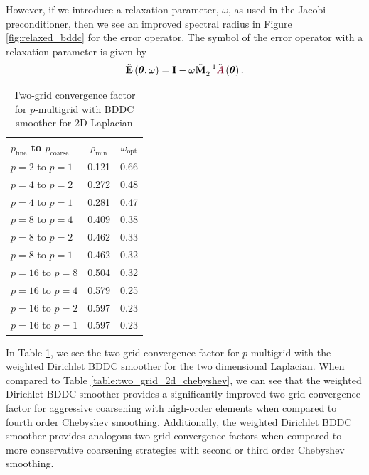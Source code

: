 However, if we introduce a relaxation parameter, $\omega$, as used in the Jacobi preconditioner, then we see an improved spectral radius in Figure \ref{fig:relaxed_bddc} for the error operator.
The symbol of the error operator with a relaxation parameter is given by
\begin{equation}
\tilde{\mathbf{E}} \left( \boldsymbol{\theta}, \omega \right) = \mathbf{I} - \omega \tilde{\mathbf{M}}_2^{-1} \tilde{{\color{burgundy}A}} \left( \boldsymbol{\theta} \right).
\end{equation}

\begin{table}[ht!]
\begin{center}
\begin{tabular}{l cc}
  \toprule
  $p_{\text{fine}}$ to $p_{\text{coarse}}$  & $\rho_{\min}$ & $\omega_{\text{opt}}$  \\
  \toprule
  $p = 2$ to $p = 1$   &  0.121 & 0.66  \\
  \midrule
  $p = 4$ to $p = 2$   &  0.272 & 0.48  \\
  $p = 4$ to $p = 1$   &  0.281 & 0.47  \\
  \midrule
  $p = 8$ to $p = 4$   &  0.409 & 0.38  \\
  $p = 8$ to $p = 2$   &  0.462 & 0.33  \\
  $p = 8$ to $p = 1$   &  0.462 & 0.32  \\
  \midrule
  $p = 16$ to $p = 8$  &  0.504 & 0.32  \\
  $p = 16$ to $p = 4$  &  0.579 & 0.25  \\
  $p = 16$ to $p = 2$  &  0.597 & 0.23  \\
  $p = 16$ to $p = 1$  &  0.597 & 0.23  \\
  \bottomrule
\end{tabular}
\end{center}
\caption{Two-grid convergence factor for $p$-multigrid with BDDC smoother for 2D Laplacian}
\label{table:two_grid_bddc_smoother}
\end{table}

In Table \ref{table:two_grid_bddc_smoother}, we see the two-grid convergence factor for $p$-multigrid with the weighted Dirichlet BDDC smoother for the two dimensional Laplacian.
When compared to Table \ref{table:two_grid_2d_chebyshev}, we can see that the weighted Dirichlet BDDC smoother provides a significantly improved two-grid convergence factor for aggressive coarsening with high-order elements when compared to fourth order Chebyshev smoothing.
Additionally, the weighted Dirichlet BDDC smoother provides analogous two-grid convergence factors when compared to more conservative coarsening strategies with second or third order Chebyshev smoothing.
